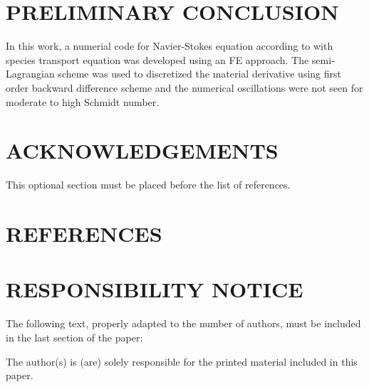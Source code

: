 \documentclass[10pt,fleqn,a4paper,twoside]{article}
\begin{document}
\section{PRELIMINARY CONCLUSION}
In this work, a numerial code for Navier-Stokes equation according to 
with species
transport equation was developed using an FE approach.
The semi-Lagrangian scheme was used to discretized the material derivative
using first order backward difference scheme and the numerical oscillations
were not seen for moderate to high Schmidt number.

\smallskip



\section{ACKNOWLEDGEMENTS}
This optional section must be placed before the list of references.

\section{REFERENCES} 
\label{Sec:references}


\renewcommand{\refname}{}




\section{RESPONSIBILITY NOTICE}
The following text, properly adapted to the number of authors, must be included in the last section of the paper:

The author(s) is (are) solely responsible for the printed material included in this paper.
\end{document}
